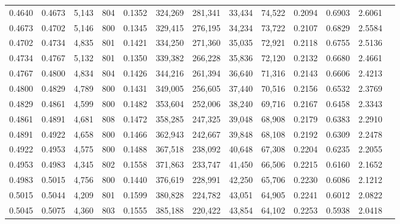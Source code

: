 \begin{tabular}{rrrrrrrrrrrrr}
0.4640 & 0.4673 &  5,143 & 804 &                                     0.1352 & 324,269 & 281,341 &  33,434 &  74,522 & 0.2094 & 0.6903 & 2.6061 \\
0.4673 & 0.4702 &  5,146 & 800 &                                     0.1345 & 329,415 & 276,195 &  34,234 &  73,722 & 0.2107 & 0.6829 & 2.5584 \\
0.4702 & 0.4734 &  4,835 & 801 &                                     0.1421 & 334,250 & 271,360 &  35,035 &  72,921 & 0.2118 & 0.6755 & 2.5136 \\
0.4734 & 0.4767 &  5,132 & 801 &                                     0.1350 & 339,382 & 266,228 &  35,836 &  72,120 & 0.2132 & 0.6680 & 2.4661 \\
0.4767 & 0.4800 &  4,834 & 804 &                                     0.1426 & 344,216 & 261,394 &  36,640 &  71,316 & 0.2143 & 0.6606 & 2.4213 \\
0.4800 & 0.4829 &  4,789 & 800 &                                     0.1431 & 349,005 & 256,605 &  37,440 &  70,516 & 0.2156 & 0.6532 & 2.3769 \\
0.4829 & 0.4861 &  4,599 & 800 &                                     0.1482 & 353,604 & 252,006 &  38,240 &  69,716 & 0.2167 & 0.6458 & 2.3343 \\
0.4861 & 0.4891 &  4,681 & 808 &                                     0.1472 & 358,285 & 247,325 &  39,048 &  68,908 & 0.2179 & 0.6383 & 2.2910 \\
0.4891 & 0.4922 &  4,658 & 800 &                                     0.1466 & 362,943 & 242,667 &  39,848 &  68,108 & 0.2192 & 0.6309 & 2.2478 \\
0.4922 & 0.4953 &  4,575 & 800 &                                     0.1488 & 367,518 & 238,092 &  40,648 &  67,308 & 0.2204 & 0.6235 & 2.2055 \\
0.4953 & 0.4983 &  4,345 & 802 &                                     0.1558 & 371,863 & 233,747 &  41,450 &  66,506 & 0.2215 & 0.6160 & 2.1652 \\
0.4983 & 0.5015 &  4,756 & 800 &                                     0.1440 & 376,619 & 228,991 &  42,250 &  65,706 & 0.2230 & 0.6086 & 2.1212 \\
0.5015 & 0.5044 &  4,209 & 801 &                                     0.1599 & 380,828 & 224,782 &  43,051 &  64,905 & 0.2241 & 0.6012 & 2.0822 \\
0.5045 & 0.5075 &  4,360 & 803 &                                     0.1555 & 385,188 & 220,422 &  43,854 &  64,102 & 0.2253 & 0.5938 & 2.0418 \\

\end{tabular}
